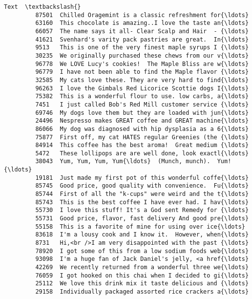 \documentclass[11pt]{article}
\begin{document}
\begin{Verbatim}[commandchars=\\\{\}]
                                                             Text  \textbackslash{}
         87501  Chilled Oragemint is a classic refreshment for{\ldots}   
         63160  This chocolate is amazing..I love the taste an{\ldots}   
         66057  The name says it all- Clear Scalp and Hair  - {\ldots}   
         41621  Svenhard's varity pack pastries are great.  In{\ldots}   
         9513   This is one of the very finest maple syrups I {\ldots}   
         30235  We originally purchased these chews from our v{\ldots}   
         96778  We LOVE Lucy's cookies!  The Maple Bliss are w{\ldots}   
         96779  I have not been able to find the Maple flavor {\ldots}   
         32585  My cats love these. They are very hard to find{\ldots}   
         96263  I love the Gimbals Red Licorice Scottie dogs I{\ldots}   
         75382  This is a wonderful flour to use. low carbs, a{\ldots}   
         7451   I just called Bob's Red Mill customer service {\ldots}   
         69746  My dogs love them but they are loaded with jun{\ldots}   
         24496  Nespresso makes GREAT coffee and GREAT machine{\ldots}   
         86066  My dog was diagnosed with hip dysplasia as a 6{\ldots}   
         75877  First off, my cat HATES regular Greenies (the {\ldots}   
         84914  This coffee has the best aroma!  Great medium {\ldots}   
         5472   These lollipops are are well done, look exactl{\ldots}   
         38043  Yum, Yum, Yum, Yum{\ldots}  (Munch, munch).  Yum!  {\ldots}   
         19181  Just made my first pot of this wonderful coffe{\ldots}   
         85745  Good price, good quality with convenience.  Fu{\ldots}   
         85744  First of all the "k-cups" were weird and the t{\ldots}   
         85743  This is the best coffee I have ever had. I hav{\ldots}   
         55730  I love this stuff! It's a God sent Remedy for {\ldots}   
         55731  Good price, flavor, fast delivery And good pre{\ldots}   
         55158  This is a favorite of mine for using over ice{\ldots}   
         83618  I'm a lousy cook and I know it.  However, when{\ldots}   
         8731   Hi,<br />I am very disappointed with the past {\ldots}   
         78920  I got some of this from a low sodium foods web{\ldots}   
         93098  I'm a huge fan of Jack Daniel's jelly, <a href{\ldots}   
         42269  We recently returned from a wonderful three we{\ldots}   
         76059  I got hooked on this chai when I decided to gi{\ldots}   
         25112  We love this drink mix it taste delicious and {\ldots}   
         29158  Individually packaged assorted rice crackers a{\ldots}   

\end{Verbatim}
\end{document}
